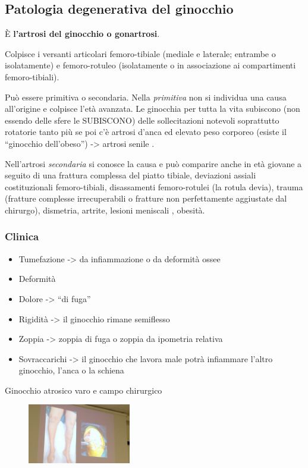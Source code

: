 \subsection{Patologia degenerativa del ginocchio}

È \textbf{l'artrosi del ginocchio o gonartrosi}.

Colpisce i versanti articolari femoro-tibiale (mediale e laterale; entrambe o isolatamente) e femoro-rotuleo (isolatamente o in associazione ai compartimenti femoro-tibiali).

Può essere primitiva o secondaria. Nella \emph{primitiva} non si individua una causa all'origine e colpisce l'età avanzata. Le ginocchia per tutta la vita subiscono (non essendo delle sfere le SUBISCONO) delle sollecitazioni notevoli soprattutto rotatorie tanto più se poi c'è artrosi d'anca ed elevato peso corporeo (esiste il ``ginocchio dell'obeso'') -> artrosi senile .

Nell'artrosi \emph{secondaria} si conosce la causa e può comparire anche in età giovane a seguito di una frattura complessa del piatto tibiale, deviazioni assiali costituzionali femoro-tibiali, disassamenti femoro-rotulei (la rotula devia), trauma (fratture complesse irrecuperabili o fratture non perfettamente aggiustate dal chirurgo), dismetria, artrite, lesioni meniscali , obesità.

\subsubsection{Clinica}

\begin{itemize}
\item
  Tumefazione -> da infiammazione o da deformità ossee
\item
  Deformità
\item
  Dolore -> ``di fuga''
\item
  Rigidità -> il ginocchio rimane semiflesso
\item
  Zoppia -> zoppia di fuga o zoppia da ipometria relativa
\item
  Sovraccarichi -> il ginocchio che lavora male potrà infiammare l'altro ginocchio, l'anca o la schiena
\end{itemize}

Ginocchio atrosico varo e campo chirurgico

\begin{figure}[!ht]
\centering
\includegraphics[width=0.4\textwidth]{009/image21.png}
\end{figure}

